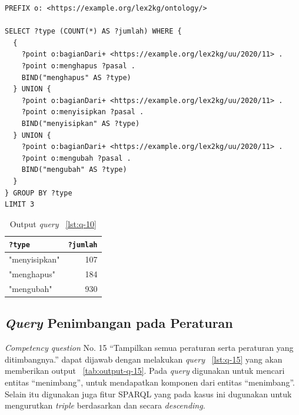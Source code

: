 \begin{listing}[H]
  \begin{verbatim}
PREFIX o: <https://example.org/lex2kg/ontology/>

SELECT ?type (COUNT(*) AS ?jumlah) WHERE {
  {
    ?point o:bagianDari+ <https://example.org/lex2kg/uu/2020/11> .
    ?point o:menghapus ?pasal .
    BIND("menghapus" AS ?type)
  } UNION {
    ?point o:bagianDari+ <https://example.org/lex2kg/uu/2020/11> .
    ?point o:menyisipkan ?pasal .
    BIND("menyisipkan" AS ?type)
  } UNION {
    ?point o:bagianDari+ <https://example.org/lex2kg/uu/2020/11> .
    ?point o:mengubah ?pasal .
    BIND("mengubah" AS ?type)
  }
} GROUP BY ?type
LIMIT 3
  \end{verbatim}
  \caption{SPARQL \textit{query} untuk \textit{competency question} No. 10}
  \label{lst:q-10}
\end{listing}

\begin{table}
  \centering
  \begin{tabular}{|l|r|} \hline
    \texttt{?type} & \texttt{?jumlah} \\\hline \hline
    "menyisipkan"  & 107              \\\hline
    "menghapus"    & 184              \\\hline
    "mengubah"     & 930              \\\hline
  \end{tabular}
  \caption{Output \textit{query} \lst~\ref{lst:q-10} }
  \label{tab:output-q-10}
\end{table}

\subsection{\textit{Query} Penimbangan pada Peraturan}
\label{subsec:cq15}

\textit{Competency question} No. 15 ``Tampilkan semua peraturan serta peraturan yang ditimbangnya.''
dapat dijawab dengan melakukan \textit{query} \lst~\ref{lst:q-15} yang akan memberikan output
\tab~\ref{tab:output-q-15}. Pada \textit{query} digunakan  untuk mencari entitas
``menimbang'',  untuk mendapatkan komponen dari entitas ``menimbang''. Selain itu
digunakan juga fitur SPARQL  yang pada kasus ini dugunakan untuk mengurutkan
\textit{triple} berdasarkan  dan  secara \textit{descending}.


